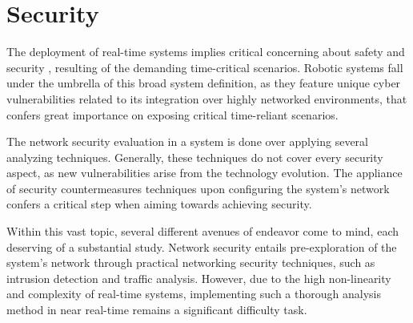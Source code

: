 \section{Security}

The deployment of real-time systems implies critical concerning about safety and security \cite{maruyama2016exploring}, resulting of the demanding time-critical scenarios. Robotic systems fall under the umbrella of this broad system definition, as they feature unique cyber vulnerabilities related to its integration over highly networked environments, that confers great importance on exposing critical time-reliant scenarios. \cite{mcclean2013preliminary, dieber2017security} 

The network security evaluation in a system is done over applying several analyzing techniques. Generally, these techniques do not cover every security aspect, as new vulnerabilities arise from the technology evolution. \cite{kaeo2004designing}
The appliance of security countermeasures techniques upon configuring the system's network confers a critical step when aiming towards achieving security.

Within this vast topic, several different avenues of endeavor come to mind, each deserving of a substantial study. Network security entails pre-exploration of the system's network through practical networking security techniques, such as intrusion detection and traffic analysis. \cite{marin2005network} However, due to the high non-linearity and complexity of real-time systems, implementing such a thorough analysis method in near real-time remains a significant difficulty task. \cite{diao2009design}



